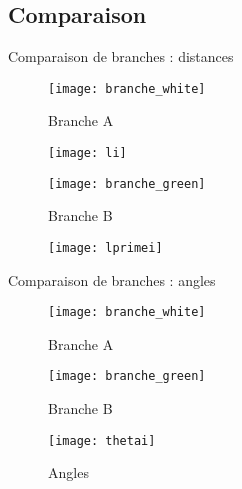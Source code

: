 \subsection{Comparaison}
\begin{frame}{Comparaison de branches : distances}
    \begin{minipage}{0.45\textwidth}%
        \begin{figure}[!htb]
            \centering
            \texttt{[image: branche\_white]}
            \caption{\label{fig: b_white} Branche A}
        \end{figure}
        \begin{figure}[!htb]
            \centering
            \texttt{[image: li]}
        \end{figure}
    \end{minipage}%
    \hfill
    \begin{minipage}{0.45\textwidth}%
        \begin{figure}[!htb]
            \centering
            \texttt{[image: branche\_green]}
            \caption{\label{fig: b_green} Branche B}
        \end{figure}
        \begin{figure}[!htb]
            \centering
            \texttt{[image: lprimei]}
        \end{figure}
    \end{minipage}%
\end{frame}

\begin{frame}{Comparaison de branches : angles}
    \begin{multicols}{2}
        \begin{figure}[!htb]
            \centering
            \texttt{[image: branche\_white]}
            \caption{\label{fig: b_white2} Branche A}
        \end{figure}
        \begin{figure}[!htb]
            \centering
            \texttt{[image: branche\_green]}
            \caption{\label{fig: b_green2} Branche B}
        \end{figure}
    \end{multicols}
    \begin{figure}[!htb]
        \centering
        \texttt{[image: thetai]}
        \caption{\label{fig: thetai} Angles}
    \end{figure}
\end{frame}

